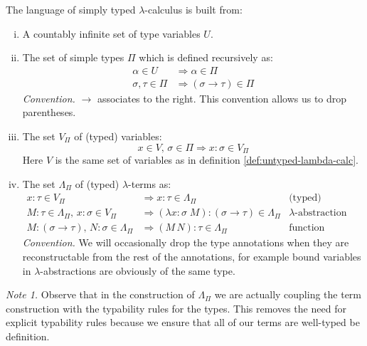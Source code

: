 \begin{definition}
The language of simply typed $\lambda$-calculus is built from:
    \begin{enumerate}[(i)]
        \item A countably infinite set of type variables $U$.
        \item The set of simple types $\Pi$ which is defined recursively as:
        \begin{align*}
            \alpha \in U &\Rightarrow \alpha \in \Pi \\
            \sigma, \tau \in \Pi &\Rightarrow (\sigma \to \tau) \in \Pi
        \end{align*}
            \emph{Convention.} $\to$ associates to the right. This convention
            allows us to drop parentheses.
        \item The set $V_\Pi$ of (typed) variables:
            \[ x \in V,\, \sigma \in \Pi \Rightarrow x\!:\!\sigma \in V_\Pi \]
                Here $V$ is the same set of variables as in definition
                \ref{def:untyped-lambda-calc}.
        \item The set $\Lambda_\Pi$ of (typed) $\lambda$-terms as:
                \begin{align*}
                    x\!:\!\tau \in V_\Pi
                        &\Rightarrow x\!:\!\tau \in \Lambda_\Pi &
                            \text{(typed) variables} \\
                    M\!:\!\tau \in \Lambda_\Pi,\, x\!:\!\sigma \in V_\Pi
                        &\Rightarrow (\lambda x\!:\!\sigma\; M)\!:\!(\sigma \to
                        \tau) \in \Lambda_\Pi &
                            \text{$\lambda$-abstraction} \\
                    M\!:\!(\sigma \to \tau),\, N\!:\!\sigma \in \Lambda_\Pi
                        &\Rightarrow (M\, N)\!:\!\tau \in \Lambda_\Pi &
                            \text{function application}
                \end{align*}
            \emph{Convention.} We will occasionally drop the type annotations
            when they are reconstructable from the rest of the annotations, for
            example bound variables in $\lambda$-abstractions are obviously of
            the same type.

        \end{enumerate}
\end{definition}
\emph{Note 1.}
    Observe that in the construction of $\Lambda_\Pi$ we are actually coupling the
    term construction with the typability rules for the types. This removes the
    need for explicit typability rules because we ensure that all of our terms
    are well-typed be definition.

